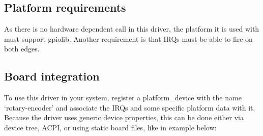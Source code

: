 \documentclass[a4paper,8pt,english]{sphinxmanual}
\begin{document}
\subsection{Platform requirements}
\label{input/devices/rotary-encoder:platform-requirements}
As there is no hardware dependent call in this driver, the platform it is
used with must support gpiolib. Another requirement is that IRQs must be
able to fire on both edges.


\subsection{Board integration}
\label{input/devices/rotary-encoder:board-integration}
To use this driver in your system, register a platform\_device with the
name `rotary-encoder' and associate the IRQs and some specific platform
data with it. Because the driver uses generic device properties, this can
be done either via device tree, ACPI, or using static board files, like in
example below:
\end{document}
